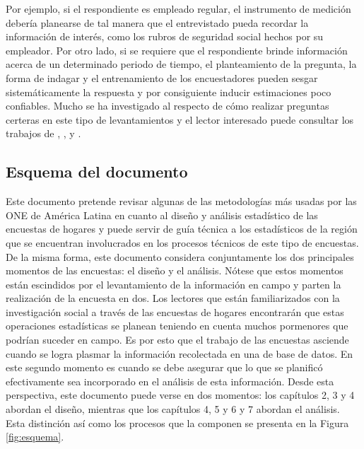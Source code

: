 \documentclass[
  10pt,
  spanish,
]{book}
\begin{document}
Por ejemplo, si el respondiente es empleado regular, el instrumento de medición debería planearse de tal manera que el entrevistado pueda recordar la información de interés, como los rubros de seguridad social hechos por su empleador. Por otro lado, si se requiere que el respondiente brinde información acerca de un determinado periodo de tiempo, el planteamiento de la pregunta, la forma de indagar y el entrenamiento de los encuestadores pueden sesgar sistemáticamente la respuesta y por consiguiente inducir estimaciones poco confiables. Mucho se ha investigado al respecto de cómo realizar preguntas certeras en este tipo de levantamientos y el lector interesado puede consultar los trabajos de \citet{Biemer_Lyberg_2003}, \citet{Presser_Rothgeb_Couper_Lessler_Martin_Martin_Singer_2004}, y \citet{Groves_Fowler_Couper_Lepkowski_Singer_Tourangeau_2009}.

\hypertarget{esquema-del-documento}{%
\subsection*{Esquema del documento}\label{esquema-del-documento}}

Este documento pretende revisar algunas de las metodologías más usadas por las ONE de América Latina en cuanto al diseño y análisis estadístico de las encuestas de hogares y puede servir de guía técnica a los estadísticos de la región que se encuentran involucrados en los procesos técnicos de este tipo de encuestas. De la misma forma, este documento considera conjuntamente los dos principales momentos de las encuestas: el diseño y el análisis. Nótese que estos momentos están escindidos por el levantamiento de la información en campo y parten la realización de la encuesta en dos. Los lectores que están familiarizados con la investigación social a través de las encuestas de hogares encontrarán que estas operaciones estadísticas se planean teniendo en cuenta muchos pormenores que podrían suceder en campo. Es por esto que el trabajo de las encuestas asciende cuando se logra plasmar la información recolectada en una de base de datos. En este segundo momento es cuando se debe asegurar que lo que se planificó efectivamente sea incorporado en el análisis de esta información. Desde esta perspectiva, este documento puede verse en dos momentos: los capítulos 2, 3 y 4 abordan el diseño, mientras que los capítulos 4, 5 y 6 y 7 abordan el análisis. Esta distinción así como los procesos que la componen se presenta en la Figura \ref{fig:esquema}.
\end{document}
